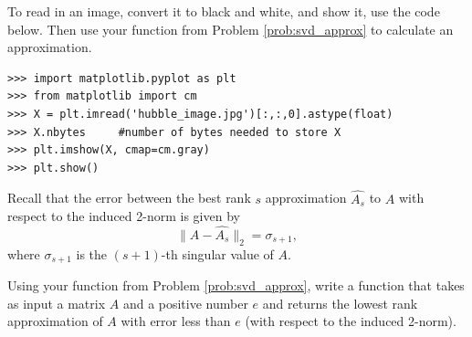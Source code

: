 To read in an image, convert it to black and white, and show it, use the code below.
Then use your function from Problem \ref{prob:svd_approx} to calculate an approximation.
\begin{lstlisting}
>>> import matplotlib.pyplot as plt
>>> from matplotlib import cm
>>> X = plt.imread('hubble_image.jpg')[:,:,0].astype(float)
>>> X.nbytes     #number of bytes needed to store X
>>> plt.imshow(X, cmap=cm.gray)
>>> plt.show()
\end{lstlisting}

Recall that the error between the best rank $s$ approximation $\widehat{A_s}$ to $A$ with respect to the induced 
2-norm is given by
$$
\|A - \widehat{A_s}\|_2 = \sigma_{s+1},
$$
where $\sigma_{s+1}$ is the $(s+1)$-th singular value of $A$. 

\begin{problem}
Using your  function from Problem \ref{prob:svd_approx}, write a function  that takes as input a matrix $A$ and a positive number $e$ and returns
the lowest rank approximation of $A$ with error less than $e$ (with respect to the induced 2-norm).
\end{problem}

